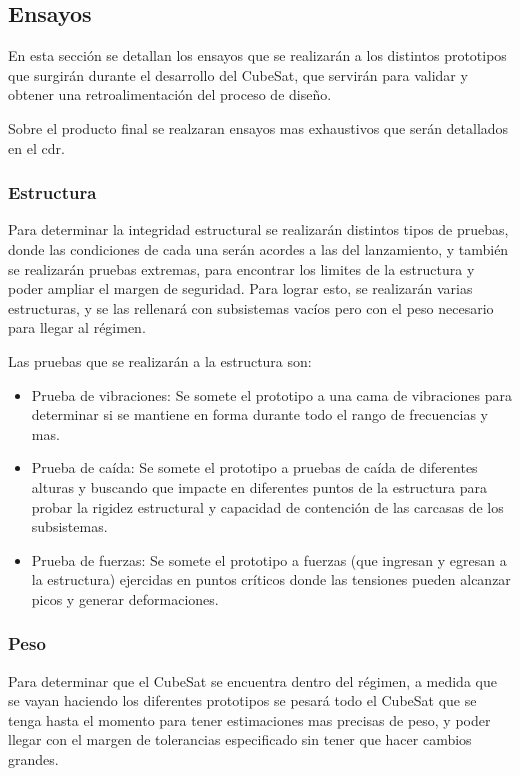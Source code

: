   \subsection{Ensayos}
    En esta sección se detallan los ensayos que se realizarán a los distintos prototipos que surgirán durante el
    desarrollo del CubeSat, que servirán para validar y obtener una retroalimentación del proceso de diseño.

    Sobre el producto final se realzaran ensayos mas exhaustivos que serán detallados en el \acrshort{cdr}.

    \subsubsection{Estructura}
      Para determinar la integridad estructural se realizarán distintos tipos de pruebas, donde las condiciones de cada
      una serán acordes a las del lanzamiento, y también se realizarán pruebas extremas, para encontrar los limites de
      la estructura y poder ampliar el margen de seguridad. Para lograr esto, se realizarán varias estructuras, y se las
      rellenará con subsistemas vacíos pero con el peso necesario para llegar al régimen.

      Las pruebas que se realizarán a la estructura son:
      \begin{itemize}
        \item Prueba de vibraciones: Se somete el prototipo a una cama de vibraciones para determinar si se mantiene en
          forma durante todo el rango de frecuencias y mas.
        \item Prueba de caída: Se somete el prototipo a pruebas de caída de diferentes alturas y buscando que impacte en
          diferentes puntos de la estructura para probar la rigidez estructural y capacidad de contención de las
          carcasas de los subsistemas.
        \item Prueba de fuerzas: Se somete el prototipo a fuerzas (que ingresan y egresan a la estructura) ejercidas en
          puntos críticos donde las tensiones pueden alcanzar picos y generar deformaciones.
      \end{itemize}
    \subsubsection{Peso}
      Para determinar que el CubeSat se encuentra dentro del régimen, a medida que se vayan haciendo los diferentes
      prototipos se pesará todo el CubeSat que se tenga hasta el momento para tener estimaciones mas precisas de peso, y
      poder llegar con el margen de tolerancias especificado sin tener que hacer cambios grandes.

